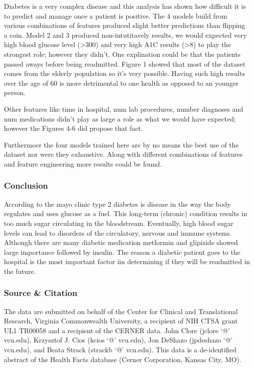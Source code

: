 \documentclass[5p]{elsarticle} %
\begin{document}
Diabetes is a very complex disease and this analysis has shown how
difficult it is to predict and manage once a patient is positive. The 4
models build from various combinations of features produced slight
better predictions than flipping a coin. Model 2 and 3 produced
non-intutitavely results, we would expected very high blood glucose
level (\textgreater300) and very high A1C results (\textgreater8) to
play the strongest role; however they didn't. One explination could be
that the patients passed aways before being readmitted. Figure 1 showed
that most of the dataset comes from the elderly population so it's very
possible. Having such high results over the age of 60 is more
detrimental to one health as opposed to an younger person.

Other features like time in hospital, num lab procedures, number
diagnoses and num medications didn't play as large a role as what we
would have expected; however the Figures 4-6 did propose that fact.

Furthermoer the four models trained here are by no means the best use of
the dataset nor were they exhaustive. Along with different combinations
of features and feature engineering more results could be found.

\hypertarget{conclusion}{%
\subsubsection{Conclusion}\label{conclusion}}

According to the mayo clinic type 2 diabetes is disease in the way the
body regulates and uses glucose as a fuel. This long-term (chronic)
condition results in too much sugar circulating in the bloodstream.
Eventually, high blood sugar levels can lead to disorders of the
circulatory, nervous and immune systems. Although there are many
diabetic medication metformin and glipizide showed large importance
followed by insulin. The reason a diabetic patient goes to the hospital
is the most important factor iin determining if they will be readmitted
in the future.

\hypertarget{source-citation}{%
\subsubsection{Source \& Citation}\label{source-citation}}

The data are submitted on behalf of the Center for Clinical and
Translational Research, Virginia Commonwealth University, a recipient of
NIH CTSA grant UL1 TR00058 and a recipient of the CERNER data. John
Clore (jclore `@' vcu.edu), Krzysztof J. Cios (kcios `@' vcu.edu), Jon
DeShazo (jpdeshazo `@' vcu.edu), and Beata Strack (strackb `@' vcu.edu).
This data is a de-identified abstract of the Health Facts database
(Cerner Corporation, Kansas City, MO).
\end{document}
